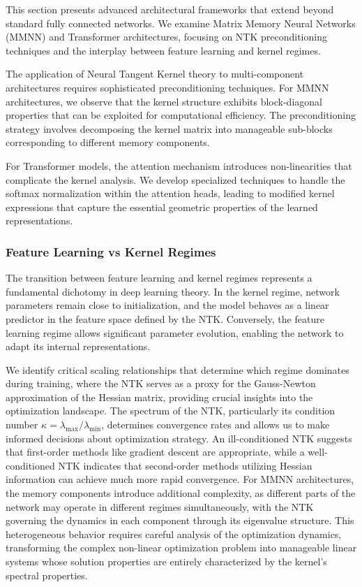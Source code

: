\documentclass[a4paper]{article}
\theoremstyle{plain}
\theoremstyle{definition}
\theoremstyle{remark}
\begin{document}
This section presents advanced architectural frameworks that extend beyond standard fully connected networks. We examine Matrix Memory Neural Networks (MMNN) and Transformer architectures, focusing on NTK preconditioning techniques and the interplay between feature learning and kernel regimes.

The application of Neural Tangent Kernel theory to multi-component architectures requires sophisticated preconditioning techniques. For MMNN architectures, we observe that the kernel structure exhibits block-diagonal properties that can be exploited for computational efficiency. The preconditioning strategy involves decomposing the kernel matrix into manageable sub-blocks corresponding to different memory components.

For Transformer models, the attention mechanism introduces non-linearities that complicate the kernel analysis. We develop specialized techniques to handle the softmax normalization within the attention heads, leading to modified kernel expressions that capture the essential geometric properties of the learned representations.








\subsubsection{Feature Learning vs Kernel Regimes}

The transition between feature learning and kernel regimes represents a fundamental dichotomy in deep learning theory. In the kernel regime, network parameters remain close to initialization, and the model behaves as a linear predictor in the feature space defined by the NTK. Conversely, the feature learning regime allows significant parameter evolution, enabling the network to adapt its internal representations.

We identify critical scaling relationships that determine which regime dominates during training, where the NTK serves as a proxy for the Gauss-Newton approximation of the Hessian matrix, providing crucial insights into the optimization landscape. The spectrum of the NTK, particularly its condition number $\kappa = \lambda_{\max}/\lambda_{\min}$, determines convergence rates and allows us to make informed decisions about optimization strategy. An ill-conditioned NTK suggests that first-order methods like gradient descent are appropriate, while a well-conditioned NTK indicates that second-order methods utilizing Hessian information can achieve much more rapid convergence. For MMNN architectures, the memory components introduce additional complexity, as different parts of the network may operate in different regimes simultaneously, with the NTK governing the dynamics in each component through its eigenvalue structure. This heterogeneous behavior requires careful analysis of the optimization dynamics, transforming the complex non-linear optimization problem into manageable linear systems whose solution properties are entirely characterized by the kernel's spectral properties.
\end{document}
